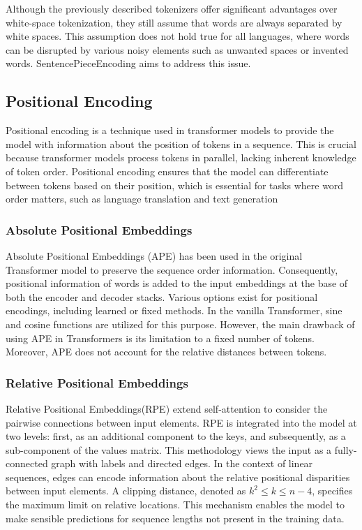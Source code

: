 Although the previously described tokenizers offer significant advantages over white-space tokenization, they still assume that words are always separated by white spaces. This assumption does not hold true for all languages, where words can be disrupted by various noisy elements such as unwanted spaces or invented words. SentencePieceEncoding aims to address this issue.

\subsection{Positional Encoding}

Positional encoding is a technique used in transformer models to provide the model with information about the position of tokens in a sequence. This is crucial because transformer models process tokens in parallel, lacking inherent knowledge of token order. Positional encoding ensures that the model can differentiate between tokens based on their position, which is essential for tasks where word order matters, such as language translation and text generation

\subsubsection*{Absolute Positional Embeddings}

Absolute Positional Embeddings (APE) \cite{vaswani2023attention} has been used in the original Transformer model to preserve the sequence order information. Consequently, positional information of words is added to the input embeddings at the base of both the encoder and decoder stacks. Various options exist for positional encodings, including learned or fixed methods. In the vanilla Transformer, sine and cosine functions are utilized for this purpose. However, the main drawback of using APE in Transformers is its limitation to a fixed number of tokens. Moreover, APE does not account for the relative distances between tokens.


\subsubsection*{Relative Positional Embeddings}

Relative Positional Embeddings(RPE) \cite{shaw2018selfattention} extend self-attention to consider the pairwise connections between input elements. RPE is integrated into the model at two levels: first, as an additional component to the keys, and subsequently, as a sub-component of the values matrix. This methodology views the input as a fully-connected graph with labels and directed edges. In the context of linear sequences, edges can encode information about the relative positional disparities between input elements. A clipping distance, denoted as \( k^2 \leq k \leq n - 4 \), specifies the maximum limit on relative locations. This mechanism enables the model to make sensible predictions for sequence lengths not present in the training data.

